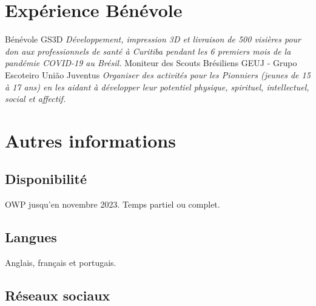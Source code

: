 \documentclass[letterpaper]{twentysecondcv} %
\begin{document}

\section{Expérience Bénévole}

\begin{twenty} %
						{Bénévole}
						{GS3D}
						{\emph{Développement, impression 3D et livraison de 500 visières pour don aux professionnels de santé à Curitiba pendant les 6 premiers mois de la pandémie COVID-19 au Brésil.}}
						{Moniteur des Scouts Brésiliens}
						{GEUJ - Grupo Escoteiro União Juventus}
						{\emph{Organiser des activités pour les Pionniers (jeunes de 15 à 17 ans) en les aidant à développer leur potentiel physique, spirituel, intellectuel, social et affectif.}}
\end{twenty}

\section{Autres informations}
\subsection{Disponibilité}
OWP jusqu'en novembre 2023. Temps partiel ou complet.
\subsection{Langues}
Anglais, français et portugais.
\subsection{Réseaux sociaux}
\begin{twenty}
\end{twenty}
\end{document}
